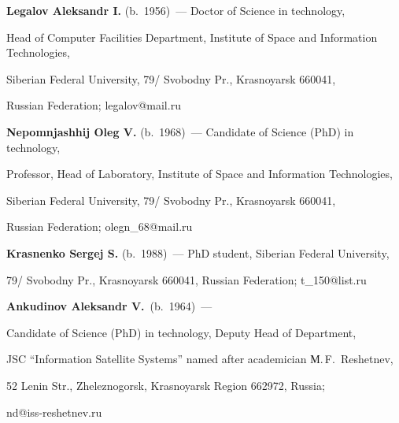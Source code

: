 \noindent


\textbf{Legalov Aleksandr I.} (b.\ 1956)~--- Doctor of Science in technology,


Head of Computer Facilities Department, Institute of Space and Information Technologies,


Siberian Federal University, 79\!/ Svobodny Pr.,  Krasnoyarsk 660041,


Russian Federation;  legalov@mail.ru





\vspace*{3pt}





\noindent


\textbf{Nepomnjashhij Oleg V.} (b.\ 1968)~--- Candidate of Science (PhD) in technology,


Professor, Head of Laboratory, Institute of Space and Information Technologies,


Siberian Federal University, 79\!/ Svobodny Pr.,  Krasnoyarsk 660041,


Russian Federation; olegn\_68@mail.ru





\vspace*{3pt}





\noindent


\textbf{Krasnenko Sergej S.} (b.\ 1988)~--- PhD student, Siberian Federal University,


79\!/ Svobodny Pr.,  Krasnoyarsk 660041, Russian Federation; t\_150@list.ru





\vspace*{3pt}







\noindent


\textbf{Ankudinov Aleksandr V.}\ (b.\ 1964)~---


Candidate of Science (PhD) in technology, Deputy Head of Department,


JSC ``Information Satellite Systems'' named after academician М.\,F.~Reshetnev,


52 Lenin Str., Zheleznogorsk, Krasnoyarsk Region 662972, Russia;


nd@iss-reshetnev.ru





\label{end\stat}





\renewcommand{\bibname}{\protect\rmfamily Литература}


